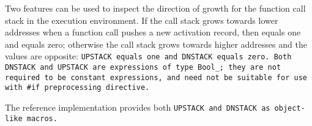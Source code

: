Two features can be used to inspect the direction of growth
for the function call stack in the execution environment.
If the call stack grows towards lower addresses when a function call pushes a
new activation record, then  equals one and  equals
zero; otherwise the call stack grows towards higher addresses and the values
are opposite: \tt{UPSTACK} equals one and \tt{DNSTACK} equals zero.
Both \tt{DNSTACK} and \tt{UPSTACK} are expressions of type \tt{Bool_};
they are not required to be constant expressions,
and need not be suitable for use with \tt{#if} preprocessing directive.

\note The reference implementation provides both
\tt{UPSTACK} and \tt{DNSTACK} as object-like macros.
